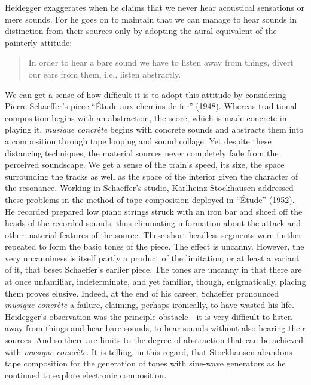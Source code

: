 Heidegger exaggerates when he claims that we never hear acoustical sensations or mere sounds. For he goes on to maintain that we can manage to hear sounds in distinction from their sources only by adopting the aural equivalent of the painterly attitude:
\begin{quote}
    In order to hear a bare sound we have to listen away from things, divert our ears from them, i.e., listen abstractly. \citep[152]{Heidegger:1935uq}
\end{quote}
We can get a sense of how difficult it is to adopt this attitude by considering Pierre Schaeffer's piece ``Étude aux chemins de fer'' (1948). Whereas traditional composition begins with an abstraction, the score, which is made concrete in playing it, \emph{musique concrète} begins with concrete sounds and abstracts them into a composition through tape looping and sound collage. Yet despite these distancing techniques, the material sources never completely fade from the perceived soundscape. We get a sense of the train's speed, its size, the space surrounding the tracks as well as the space of the interior given the character of the resonance. Working in Schaeffer's studio, Karlheinz Stockhausen addressed these problems in the method of tape composition deployed in ``Étude'' (1952). He recorded prepared low piano strings struck with an iron bar and sliced off the heads of the recorded sounds, thus eliminating information about the attack and other material features of the source. These short headless segments were further repeated to form the basic tones of the piece. The effect is uncanny. However, the very uncanniness is itself partly a product of the limitation, or at least a variant of it, that beset Schaeffer's earlier piece. The tones are uncanny in that there are at once unfamiliar, indeterminate, and yet familiar, though, enigmatically, placing them proves elusive. Indeed, at the end of his career, Schaeffer pronounced \emph{musique concrète} a failure, claiming, perhaps ironically, to have wasted his life. Heidegger's observation was the principle obstacle---it is very difficult to listen away from things and hear bare sounds, to hear sounds without also hearing their sources. And so there are limits to the degree of abstraction that can be achieved with \emph{musique concrète}. It is telling, in this regard, that Stockhausen abandons tape composition for the generation of tones with sine-wave generators as he continued to explore electronic composition.

